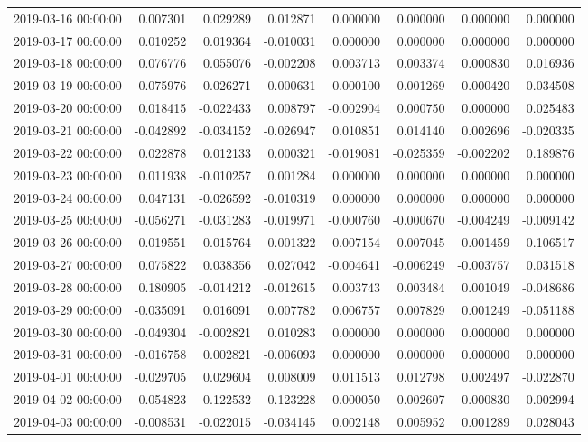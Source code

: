 \begin{tabular}{lrrrrrrr}
2019-03-16 00:00:00 & 0.007301 & 0.029289 & 0.012871 & 0.000000 & 0.000000 & 0.000000 & 0.000000 \\
2019-03-17 00:00:00 & 0.010252 & 0.019364 & -0.010031 & 0.000000 & 0.000000 & 0.000000 & 0.000000 \\
2019-03-18 00:00:00 & 0.076776 & 0.055076 & -0.002208 & 0.003713 & 0.003374 & 0.000830 & 0.016936 \\
2019-03-19 00:00:00 & -0.075976 & -0.026271 & 0.000631 & -0.000100 & 0.001269 & 0.000420 & 0.034508 \\
2019-03-20 00:00:00 & 0.018415 & -0.022433 & 0.008797 & -0.002904 & 0.000750 & 0.000000 & 0.025483 \\
2019-03-21 00:00:00 & -0.042892 & -0.034152 & -0.026947 & 0.010851 & 0.014140 & 0.002696 & -0.020335 \\
2019-03-22 00:00:00 & 0.022878 & 0.012133 & 0.000321 & -0.019081 & -0.025359 & -0.002202 & 0.189876 \\
2019-03-23 00:00:00 & 0.011938 & -0.010257 & 0.001284 & 0.000000 & 0.000000 & 0.000000 & 0.000000 \\
2019-03-24 00:00:00 & 0.047131 & -0.026592 & -0.010319 & 0.000000 & 0.000000 & 0.000000 & 0.000000 \\
2019-03-25 00:00:00 & -0.056271 & -0.031283 & -0.019971 & -0.000760 & -0.000670 & -0.004249 & -0.009142 \\
2019-03-26 00:00:00 & -0.019551 & 0.015764 & 0.001322 & 0.007154 & 0.007045 & 0.001459 & -0.106517 \\
2019-03-27 00:00:00 & 0.075822 & 0.038356 & 0.027042 & -0.004641 & -0.006249 & -0.003757 & 0.031518 \\
2019-03-28 00:00:00 & 0.180905 & -0.014212 & -0.012615 & 0.003743 & 0.003484 & 0.001049 & -0.048686 \\
2019-03-29 00:00:00 & -0.035091 & 0.016091 & 0.007782 & 0.006757 & 0.007829 & 0.001249 & -0.051188 \\
2019-03-30 00:00:00 & -0.049304 & -0.002821 & 0.010283 & 0.000000 & 0.000000 & 0.000000 & 0.000000 \\
2019-03-31 00:00:00 & -0.016758 & 0.002821 & -0.006093 & 0.000000 & 0.000000 & 0.000000 & 0.000000 \\
2019-04-01 00:00:00 & -0.029705 & 0.029604 & 0.008009 & 0.011513 & 0.012798 & 0.002497 & -0.022870 \\
2019-04-02 00:00:00 & 0.054823 & 0.122532 & 0.123228 & 0.000050 & 0.002607 & -0.000830 & -0.002994 \\
2019-04-03 00:00:00 & -0.008531 & -0.022015 & -0.034145 & 0.002148 & 0.005952 & 0.001289 & 0.028043 \\

\end{tabular}
